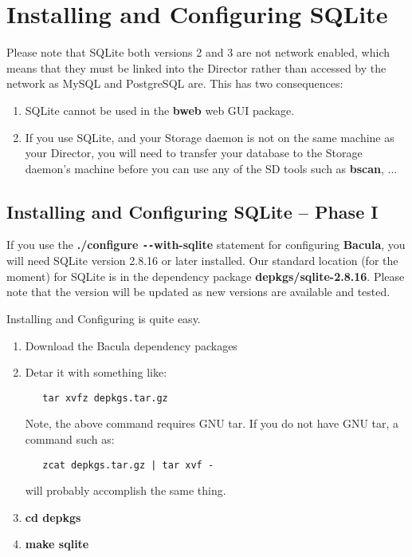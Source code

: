 
\chapter{Installing and Configuring SQLite}
\label{SqlLiteChapter}

Please note that SQLite both versions 2 and 3 are not network enabled,
which means that they must be linked into the Director rather than accessed
by the network as MySQL and PostgreSQL are. This has two consequences:
\begin{enumerate}
\item SQLite cannot be used in the {\bf bweb} web GUI package.
\item If you use SQLite, and your Storage daemon is not on the same
machine as your Director, you will need to transfer your database
to the Storage daemon's machine before you can use any of the SD tools
such as {\bf bscan}, ...
\end{enumerate}

\section{Installing and Configuring SQLite -- Phase I}

If you use the {\bf ./configure \verb:--:with-sqlite} statement for configuring {\bf
Bacula}, you will need SQLite version 2.8.16 or later installed. Our standard
location (for the moment) for SQLite is in the dependency package {\bf
depkgs/sqlite-2.8.16}. Please note that the version will be updated as new
versions are available and tested. 

Installing and Configuring is quite easy. 

\begin{enumerate}
\item Download the Bacula dependency packages  
\item Detar it with something like:

\begin{verbatim}
   tar xvfz depkgs.tar.gz
\end{verbatim}

   Note, the above command requires GNU tar. If you do not  have GNU tar, a
   command such as:

\begin{verbatim}
   zcat depkgs.tar.gz | tar xvf -
\end{verbatim}

   will probably accomplish the same thing. 

\item {\bf cd depkgs}

\item {\bf make sqlite}  

\end{enumerate}


